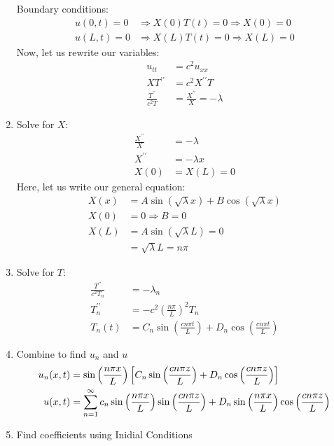 \documentclass{article}
\begin{document}
\begin{enumerate}
  Boundary conditions:
  \begin{align}
    u(0, t) = 0 & \Rightarrow X(0)T(t) = 0 \Rightarrow X(0) = 0\\
    u(L, t) = 0 & \Rightarrow X(L)T(t) = 0 \Rightarrow X(L) = 0
  \end{align}
  Now, let us rewrite our variables:
  \begin{align}
    u_{tt} & = c^2u_{xx}\\
    XT^{\prime\prime} & = c^2 X^{\prime\prime}T\\
    \frac{T^{\prime\prime}}{c^2 T} & = \frac{X^{\prime\prime}}{X} = -\lambda
  \end{align}
  \item Solve for $X$:
  \begin{align}
    \frac{X^{\prime\prime}}{X} & = -\lambda\\
    X^{\prime\prime} & = -\lambda x\\
    X(0) & = X(L) = 0
  \end{align}
  Here, let us write our general equation:
  \begin{align}
    X(x) & = A\sin(\sqrt \lambda x) + B \cos (\sqrt \lambda x)\\
    X(0) & = 0 \Rightarrow B = 0\\
    X(L) & = A \sin(\sqrt \lambda L) = 0\\
    & = \sqrt \lambda L = n \pi
  \end{align}
  \item Solve for $T$:
  \begin{align}
    \frac{T^{\prime\prime}}{c^2 T_n} & = - \lambda_n\\
    T^{\prime\prime}_n & = -c^2 \left( \frac{n \pi}{L} \right)^2 T_n\\
    T_n(t) & = C_n \sin \left( \frac{c n \pi t}{L} \right) + D_n \cos \left( \frac{c n \pi t}{L} \right)
  \end{align}
  \item Combine to find $u_n$ and $u$
  \begin{align}
    u_n(x, t) & = \sin \Big( \frac{n \pi x}{L} \Big) \left[ C_n \sin\left(\frac{ c n \pi z}{L} \right) + D_n \cos \left( \frac{c n \pi z}{L} \right) \right]\\
    u(x, t) & = \sum^\infty_{n = 1} c_n \sin \Big( \frac{n \pi x}{L} \Big) \sin \left( \frac{c n \pi z}{L}\right) + D_n \sin \Big( \frac{n \pi x}{L} \Big) \cos \left( \frac{c n \pi z}{L} \right)
  \end{align}
  \item Find coefficients using Inidial Conditions
  \begin{align}

\end{align}
\end{enumerate}
\end{document}
